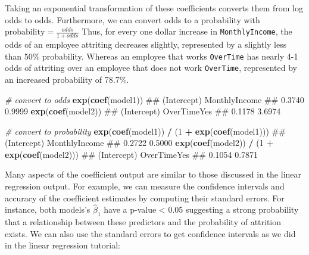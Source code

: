 \documentclass[]{book}
\newenvironment{Shaded}{\begin{snugshade}}{\end{snugshade}}
\newcommand{\CommentTok}[1]{\textcolor[rgb]{0.56,0.35,0.01}{\textit{#1}}}
\newcommand{\DecValTok}[1]{\textcolor[rgb]{0.00,0.00,0.81}{#1}}
\newcommand{\KeywordTok}[1]{\textcolor[rgb]{0.13,0.29,0.53}{\textbf{#1}}}
\newcommand{\NormalTok}[1]{#1}
\newcommand{\OperatorTok}[1]{\textcolor[rgb]{0.81,0.36,0.00}{\textbf{#1}}}
\newcommand{\StringTok}[1]{\textcolor[rgb]{0.31,0.60,0.02}{#1}}
\theoremstyle{definition}
\theoremstyle{definition}
\theoremstyle{definition}
\theoremstyle{remark}
\begin{document}
Taking an exponential transformation of these coefficients converts them
from log odds to odds. Furthermore, we can convert odds to a probability
with \(\text{probability} = \frac{odds}{1 + odds}\) Thus, for every one
dollar increase in \texttt{MonthlyIncome}, the odds of an employee
attriting decreases slightly, represented by a slightly less than 50\%
probability. Whereas an employee that works \texttt{OverTime} has nearly
4-1 odds of attriting over an employee that does not work
\texttt{OverTime}, represented by an increased probability of 78.7\%.

\begin{Shaded}
\begin{Highlighting}[]
\CommentTok{# convert to odds}
\KeywordTok{exp}\NormalTok{(}\KeywordTok{coef}\NormalTok{(model1))}
\NormalTok{##   (Intercept) MonthlyIncome }
\NormalTok{##        0.3740        0.9999}
\KeywordTok{exp}\NormalTok{(}\KeywordTok{coef}\NormalTok{(model2))}
\NormalTok{## (Intercept) OverTimeYes }
\NormalTok{##      0.1178      3.6974}

\CommentTok{# convert to probability}
\KeywordTok{exp}\NormalTok{(}\KeywordTok{coef}\NormalTok{(model1)) }\OperatorTok{/}\StringTok{ }\NormalTok{(}\DecValTok{1} \OperatorTok{+}\StringTok{ }\KeywordTok{exp}\NormalTok{(}\KeywordTok{coef}\NormalTok{(model1)))}
\NormalTok{##   (Intercept) MonthlyIncome }
\NormalTok{##        0.2722        0.5000}
\KeywordTok{exp}\NormalTok{(}\KeywordTok{coef}\NormalTok{(model2)) }\OperatorTok{/}\StringTok{ }\NormalTok{(}\DecValTok{1} \OperatorTok{+}\StringTok{ }\KeywordTok{exp}\NormalTok{(}\KeywordTok{coef}\NormalTok{(model2)))}
\NormalTok{## (Intercept) OverTimeYes }
\NormalTok{##      0.1054      0.7871}
\end{Highlighting}
\end{Shaded}

Many aspects of the coefficient output are similar to those discussed in
the linear regression output. For example, we can measure the confidence
intervals and accuracy of the coefficient estimates by computing their
standard errors. For instance, both models's \(\hat \beta_1\) have a
p-value \textless{} 0.05 suggesting a strong probability that a
relationship between these predictors and the probability of attrition
exists. We can also use the standard errors to get confidence intervals
as we did in the linear regression tutorial:

\begin{Shaded}
\end{Shaded}
\end{document}
